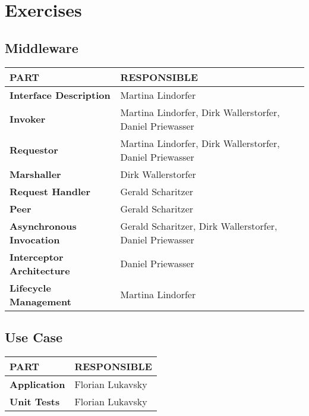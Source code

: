 \documentclass[a4paper]{article}
\begin{document}
\pagestyle{empty}
\section*{Exercises}
\vspace{0.5cm}
\subsection*{Middleware}

\begin{small}
\begin{tabular}{| p{4cm} | p{9cm} |}\hline
\textbf{PART} & \textbf{RESPONSIBLE}\\\hline\hline
\textbf{Interface Description} & Martina Lindorfer\\\hline
\textbf{Invoker} & Martina Lindorfer, Dirk Wallerstorfer, Daniel Priewasser\\\hline
\textbf{Requestor} & Martina Lindorfer, Dirk Wallerstorfer, Daniel Priewasser\\\hline
\textbf{Marshaller} & Dirk Wallerstorfer\\\hline
\textbf{Request Handler} & Gerald Scharitzer\\\hline
\textbf{Peer} & Gerald Scharitzer\\\hline
\textbf{Asynchronous Invocation} & Gerald Scharitzer, Dirk Wallerstorfer, Daniel Priewasser\\\hline
\textbf{Interceptor Architecture} & Daniel Priewasser\\\hline
\textbf{Lifecycle Management} & Martina Lindorfer\\\hline
\end{tabular}
\end{small}

\vspace{1cm}

\subsection*{Use Case}

\begin{small}
\begin{tabular}{| p{4cm} | p{9cm} |}\hline
\textbf{PART} & \textbf{RESPONSIBLE}\\\hline\hline
\textbf{Application} & Florian Lukavsky\\\hline
\textbf{Unit Tests} & Florian Lukavsky\\\hline
\end{tabular}
\end{small}
\end{document}
